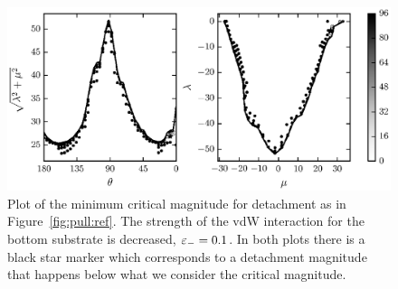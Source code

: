 {   \begin{figure}[t]
      \begin{center}
         \includegraphics{./fig/ch3/pull/eb0.1/grid.eps}
      \end{center}      
      \caption{Plot of the minimum critical magnitude for detachment as in Figure~\ref{fig:pull:ref}. The strength of the vdW interaction for the bottom substrate is decreased, $\varepsilon_-=0.1$. In both plots there is a black star marker which corresponds to a detachment magnitude that happens below what we consider the critical magnitude.
      \label{fig:pull:eb0.1}}
   \end{figure}

}
